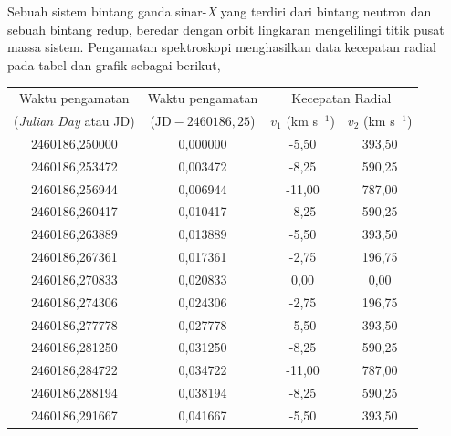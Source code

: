 \documentclass[11pt,fleqn]{exam}
\begin{document}
\begin{questions}
\begin{enumerate}[a.]
\begin{enumerate}[i.]
    \end{enumerate}
\end{enumerate}


\newpage
\question Sebuah sistem bintang ganda sinar-\textit{X} yang terdiri dari bintang neutron dan sebuah bintang redup, beredar dengan orbit lingkaran mengelilingi titik pusat massa sistem. Pengamatan spektroskopi menghasilkan data kecepatan radial pada tabel dan grafik sebagai berikut,

\begin{table}[!h]
    \centering
    \begin{tabular}{|c|c|c|c|}
    \hline
    Waktu pengamatan & Waktu pengamatan & \multicolumn{2}{|c|}{Kecepatan Radial}\\
    \cline{3-4}
    (\textit{Julian Day} atau JD)& ($\text{JD}-2460186,25$) & $v_1$ (km s$^{-1}$) & $v_2$ (km s$^{-1}$)\\
    \hline
    2460186,250000 & 0,000000 & -5,50 & 393,50\\
    \hline
    2460186,253472 & 0,003472 & -8,25 & 590,25\\
    \hline
    2460186,256944 & 0,006944 & -11,00 & 787,00\\
    \hline
    2460186,260417 & 0,010417 & -8,25 & 590,25\\
    \hline
    2460186,263889 & 0,013889 & -5,50 & 393,50\\
    \hline
    2460186,267361 & 0,017361 & -2,75 & 196,75\\
    \hline
    2460186,270833 & 0,020833 & 0,00 & 0,00\\
    \hline
    2460186,274306 & 0,024306 & -2,75 & 196,75\\
    \hline
    2460186,277778 & 0,027778 & -5,50 & 393,50\\
    \hline
    2460186,281250 & 0,031250 & -8,25 & 590,25\\
    \hline
    2460186,284722 & 0,034722 & -11,00 & 787,00\\
    \hline
    2460186,288194 & 0,038194 & -8,25 & 590,25\\
    \hline
    2460186,291667 & 0,041667 & -5,50 & 393,50\\
    \hline
    \end{tabular}
\end{table}


\end{questions}
\end{document}
